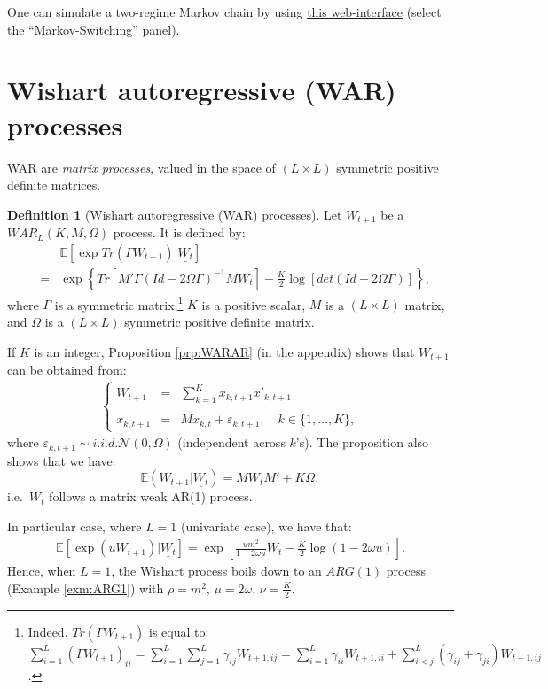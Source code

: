 \documentclass[
  12pt,
]{book}
\theoremstyle{definition}
\newtheorem{definition}{Definition}[chapter]
\theoremstyle{definition}
\theoremstyle{definition}
\theoremstyle{definition}
\theoremstyle{remark}
\begin{document}
One can simulate a two-regime Markov chain by using \href{https://jrenne.shinyapps.io/Affine/}{this web-interface} (select the ``Markov-Switching'' panel).

\hypertarget{WAR}{%
\section{Wishart autoregressive (WAR) processes}\label{WAR}}

WAR are \emph{matrix processes}, valued in the space of \((L \times L)\) symmetric positive
definite matrices.

\begin{definition}[Wishart autoregressive (WAR) processes]
\protect\hypertarget{def:WAR}{}\label{def:WAR}Let \(W_{t+1}\) be a \(WAR_L(K, M, \Omega)\) process. It is defined by:
\begin{eqnarray}
&&\mathbb{E}[\exp   Tr(\Gamma W_{t+1})|\underline{W_t}] \label{eq:Trace}\\
&=& \exp\left\{Tr[M'\Gamma(Id-2\Omega \Gamma)^{-1}M W_t]  -  \frac{K}{2}   \log [det(Id-2\Omega \Gamma)]\right\}, \nonumber
\end{eqnarray}
where \(\Gamma\) is a symmetric matrix,\footnote{Indeed, \(Tr(\Gamma W_{t+1})\) is equal to:
  \(\sum^L_{i=1}(\Gamma W_{t+1})_{ii} = \sum^L_{i=1} \sum^L_{j=1} \gamma_{ij} W_{t+1,ij} = \sum^L_{i=1} \gamma_{ii} W_{t+1,ii} + \sum^L_{i<j} (\gamma_{ij}+\gamma_{ji}) W_{t+1,ij}\).} \(K\) is a positive scalar, \(M\) is a \((L \times L)\) matrix, and \(\Omega\) is a \((L \times L)\) symmetric positive definite matrix.
\end{definition}

If \(K\) is an integer, Proposition \ref{prp:WARAR} (in the appendix) shows that \(W_{t+1}\) can be obtained from:
\begin{eqnarray*}
\left\{
\begin{array}{ccl}
W_{t+1} & =&  \sum^K_{k=1} x_{k,t+1} x'_{k,t+1}\\
&&\\
x_{k,t+1} & =& M x_{k,t} + \varepsilon_{k,t+1},\quad k \in \{1,\dots,K\},
\end{array}
\right.
\end{eqnarray*}
where \(\varepsilon_{k,t+1} \sim i.i.d. \mathcal{N}(0, \Omega)\) (independent across \(k\)'s).
The proposition also shows that we have:
\[
\mathbb{E}(W_{t+1}|\underline{W_t}) = MW_tM'+K \Omega,
\]
i.e.~\(W_t\) follows a matrix weak AR(1) process.

In particular case, where \(L=1\) (univariate case), we have that:
\begin{eqnarray*}
\mathbb{E}[\exp(u W_{t+1})|\underline{W_t}] = \exp\left[
\frac{u m^2}{1-2\omega u}W_t -
\frac{K}{2}   \log(1-2\omega u)\right].
\end{eqnarray*}
Hence, when \(L=1\), the Wishart process boils down to an \(ARG(1)\) process (Example \ref{exm:ARG1}) with \(\rho = m^2\), \(\mu = 2\omega\), \(\nu = \frac{K}{2}\).
\end{document}

